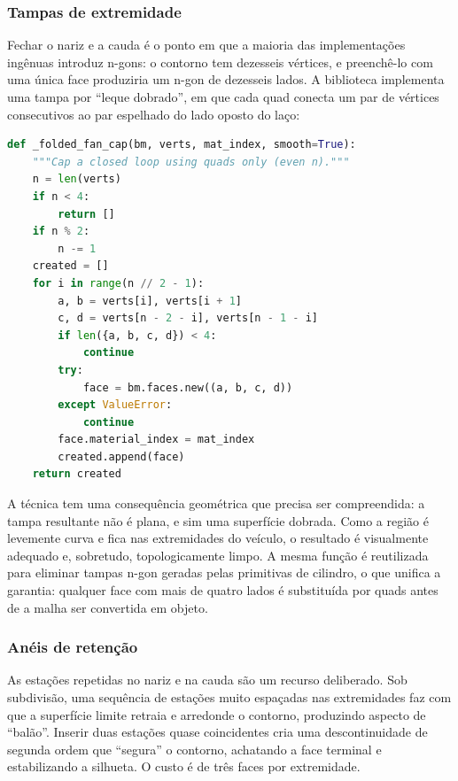 \subsubsection{Tampas de extremidade}

Fechar o nariz e a cauda \'e o ponto em que a maioria das implementa\c{c}\~oes ing\^enuas
introduz n-gons: o contorno tem dezesseis v\'ertices, e preench\^e-lo com uma \'unica face
produziria um n-gon de dezesseis lados. A biblioteca implementa uma tampa por ``leque
dobrado'', em que cada quad conecta um par de v\'ertices consecutivos ao par espelhado do
lado oposto do la\c{c}o:

\begin{lstlisting}[language=Python]
def _folded_fan_cap(bm, verts, mat_index, smooth=True):
    """Cap a closed loop using quads only (even n)."""
    n = len(verts)
    if n < 4:
        return []
    if n % 2:
        n -= 1
    created = []
    for i in range(n // 2 - 1):
        a, b = verts[i], verts[i + 1]
        c, d = verts[n - 2 - i], verts[n - 1 - i]
        if len({a, b, c, d}) < 4:
            continue
        try:
            face = bm.faces.new((a, b, c, d))
        except ValueError:
            continue
        face.material_index = mat_index
        created.append(face)
    return created
\end{lstlisting}

A t\'ecnica tem uma consequ\^encia geom\'etrica que precisa ser compreendida: a tampa
resultante n\~ao \'e plana, e sim uma superf\'icie dobrada. Como a regi\~ao \'e levemente
curva e fica nas extremidades do ve\'iculo, o resultado \'e visualmente adequado e,
sobretudo, topologicamente limpo. A mesma fun\c{c}\~ao \'e reutilizada para eliminar tampas
n-gon geradas pelas primitivas de cilindro, o que unifica a garantia: qualquer face com mais
de quatro lados \'e substitu\'ida por quads antes de a malha ser convertida em objeto.

\subsubsection{An\'eis de reten\c{c}\~ao}

As esta\c{c}\~oes repetidas no nariz e na cauda s\~ao um recurso deliberado. Sob
subdivis\~ao, uma sequ\^encia de esta\c{c}\~oes muito espa\c{c}adas nas extremidades faz
com que a superf\'icie limite retraia e arredonde o contorno, produzindo aspecto de
``bal\~ao''. Inserir duas esta\c{c}\~oes quase coincidentes cria uma descontinuidade de
segunda ordem que ``segura'' o contorno, achatando a face terminal e estabilizando a
silhueta. O custo \'e de tr\^es faces por extremidade.

